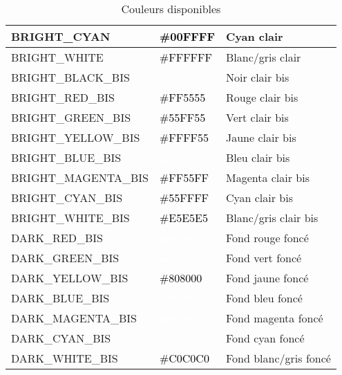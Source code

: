 \documentclass{article}
\begin{document}
\begin{table}[h!]
\begin{tabular}{|>{\centering\arraybackslash}m{4cm}|>{\centering\arraybackslash}m{3cm}|>{\centering\arraybackslash}m{3cm}|}
        \hline
        BRIGHT\_CYAN & \cellcolor[HTML]{00FFFF}\textcolor{black}{\#00FFFF} & Cyan clair \\
        \hline
        BRIGHT\_WHITE & \cellcolor[HTML]{FFFFFF}\textcolor{black}{\#FFFFFF} & Blanc/gris clair \\
        \hline
        BRIGHT\_BLACK\_BIS & \cellcolor[HTML]{555555}\textcolor{white}{\#555555} & Noir clair bis \\
        \hline
        BRIGHT\_RED\_BIS & \cellcolor[HTML]{FF5555}\textcolor{black}{\#FF5555} & Rouge clair bis \\
        \hline
        BRIGHT\_GREEN\_BIS & \cellcolor[HTML]{55FF55}\textcolor{black}{\#55FF55} & Vert clair bis \\
        \hline
        BRIGHT\_YELLOW\_BIS & \cellcolor[HTML]{FFFF55}\textcolor{black}{\#FFFF55} & Jaune clair bis \\
        \hline
        BRIGHT\_BLUE\_BIS & \cellcolor[HTML]{5555FF}\textcolor{white}{\#5555FF} & Bleu clair bis \\
        \hline
        BRIGHT\_MAGENTA\_BIS & \cellcolor[HTML]{FF55FF}\textcolor{black}{\#FF55FF} & Magenta clair bis \\
        \hline
        BRIGHT\_CYAN\_BIS & \cellcolor[HTML]{55FFFF}\textcolor{black}{\#55FFFF} & Cyan clair bis \\
        \hline
        BRIGHT\_WHITE\_BIS & \cellcolor[HTML]{E5E5E5}\textcolor{black}{\#E5E5E5} & Blanc/gris clair bis \\
        \hline
        DARK\_RED\_BIS & \cellcolor[HTML]{800000}\textcolor{white}{\#800000} & Fond rouge foncé \\
        \hline
        DARK\_GREEN\_BIS & \cellcolor[HTML]{008000}\textcolor{white}{\#008000} & Fond vert foncé \\
        \hline
        DARK\_YELLOW\_BIS & \cellcolor[HTML]{808000}\textcolor{black}{\#808000} & Fond jaune foncé \\
        \hline
        DARK\_BLUE\_BIS & \cellcolor[HTML]{000080}\textcolor{white}{\#000080} & Fond bleu foncé \\
        \hline
        DARK\_MAGENTA\_BIS & \cellcolor[HTML]{800080}\textcolor{white}{\#800080} & Fond magenta foncé \\
        \hline
        DARK\_CYAN\_BIS & \cellcolor[HTML]{008080}\textcolor{white}{\#008080} & Fond cyan foncé \\
        \hline
        DARK\_WHITE\_BIS & \cellcolor[HTML]{C0C0C0}\textcolor{black}{\#C0C0C0} & Fond blanc/gris foncé \\
        \hline
    \end{tabular}
    \label{tab:couleur}
    \caption{Couleurs disponibles}
\end{table}
\end{document}
